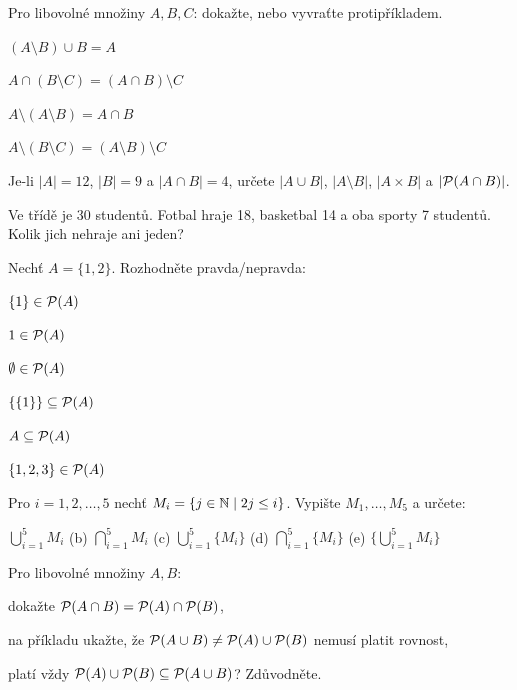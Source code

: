 \documentclass[11pt,a4paper]{article}
\begin{document}
\Needspace*{11.6cm}
Pro libovolné množiny $A,B,C$: dokažte, nebo vyvraťte protipříkladem.
\begin{dvasl}
  \item $(A\setminus B)\cup B=A$
  \item $A\cap(B\setminus C)=(A\cap B)\setminus C$
  \item $A\setminus(A\setminus B)=A\cap B$
  \item $A\setminus(B\setminus C)=(A\setminus B)\setminus C$
\end{dvasl}
\misto{8.2cm}

\Needspace*{8.2cm}
\begin{pol}
  \item Je-li $|A|=12$, $|B|=9$ a $|A\cap B|=4$, určete $|A\cup B|$, $|A\setminus B|$, $|A\times B|$ a $|\mathcal P(A\cap B)|$.
  \item Ve třídě je 30 studentů. Fotbal hraje 18, basketbal 14 a oba sporty 7 studentů. Kolik jich nehraje ani jeden?
\end{pol}
\misto{4.8cm}


\Needspace*{7.0cm}
Nechť $A=\{1,2\}$. Rozhodněte pravda/nepravda:
\begin{dvasl}
  \item $\{1\}\in\mathcal P(A)$
  \item $1\in\mathcal P(A)$
  \item $\emptyset\in\mathcal P(A)$
  \item $\{\{1\}\}\subseteq\mathcal P(A)$
  \item $A\subseteq\mathcal P(A)$
  \item $\{1,2,3\}\in\mathcal P(A)$
\end{dvasl}
\misto{3.6cm}

\Needspace*{9.8cm}
Pro $i=1,2,\dots,5$ nechť $M_i=\{j\in\mathbb N\mid 2j\le i\}$. Vypište $M_1,\dots,M_5$ a určete:
\begin{pol}
  \item $\displaystyle\bigcup_{i=1}^{5}M_i$ \qquad (b) $\displaystyle\bigcap_{i=1}^{5}M_i$ \qquad (c) $\displaystyle\bigcup_{i=1}^{5}\{M_i\}$ \qquad (d) $\displaystyle\bigcap_{i=1}^{5}\{M_i\}$ \qquad (e) $\displaystyle\Big\{\bigcup_{i=1}^{5}M_i\Big\}$
\end{pol}
\misto{6.4cm}

\Needspace*{11.0cm}
Pro libovolné množiny $A,B$:
\begin{pol}
  \item dokažte $\mathcal P(A\cap B)=\mathcal P(A)\cap\mathcal P(B)$,
  \item na příkladu ukažte, že $\mathcal P(A\cup B)\neq\mathcal P(A)\cup\mathcal P(B)$ nemusí platit rovnost,
  \item platí vždy $\mathcal P(A)\cup\mathcal P(B)\subseteq\mathcal P(A\cup B)$? Zdůvodněte.
\end{pol}
\misto{7.6cm}
\end{document}
